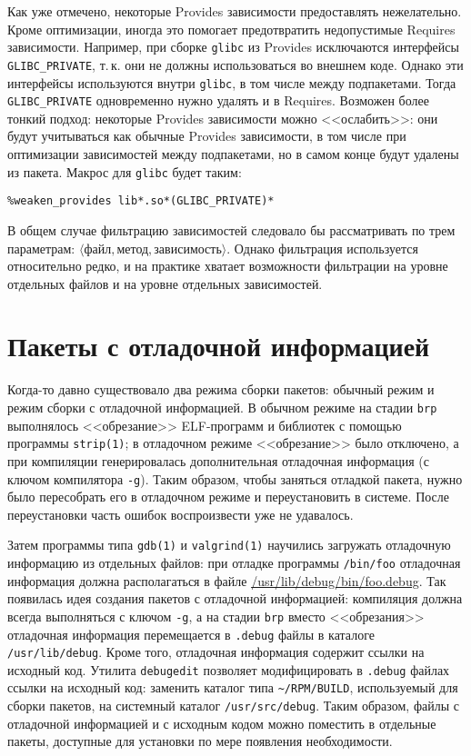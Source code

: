 \documentclass[russian,a4paper,12pt,titlepage]{article}
\begin{document}
Как уже отмечено, некоторые Provides зависимости предоставлять нежелательно.  Кроме оптимизации, иногда это помогает
предотвратить недопустимые Requires зависимости.  Например, при сборке \verb|glibc| из Provides исключаются интерфейсы
\verb|GLIBC_PRIVATE|, т.\,к. они не должны использоваться во внешнем коде.
Однако эти интерфейсы используются внутри \verb|glibc|, в том числе между подпакетами.  Тогда
\verb|GLIBC_PRIVATE| одновременно нужно удалять и в Requires.  Возможен более тонкий подход: некоторые Provides зависимости
можно <<ослабить>>: они будут учитываться как обычные Provides зависимости, в том числе при оптимизации зависимостей между
подпакетами, но в самом конце будут удалены из пакета.  Макрос для \verb|glibc| будет таким:
\begin{verbatim}
%weaken_provides lib*.so*(GLIBC_PRIVATE)*
\end{verbatim}

В общем случае фильтрацию зависимостей следовало бы рассматривать по трем параметрам:
$\langle\textit{файл},\textit{метод},\textit{зависимость}\rangle$.  Однако фильтрация используется относительно редко,
и на практике хватает возможности фильтрации на уровне отдельных файлов и на уровне отдельных зависимостей.

\section{Пакеты с отладочной информацией}
\label{debuginfo-packages}
Когда-то давно существовало два режима сборки пакетов: обычный режим и режим сборки с отладочной информацией.
В обычном режиме на стадии \verb|brp| выполнялось <<обрезание>> ELF-программ и библиотек с помощью программы \verb|strip(1)|;
в отладочном режиме <<обрезание>> было отключено, а при компиляции генерировалась дополнительная отладочная информация (с ключом
компилятора \verb|-g|).  Таким образом, чтобы заняться отладкой пакета, нужно было пересобрать его в отладочном режиме и переустановить
в системе.  После переустановки часть ошибок воспроизвести уже не удавалось.

Затем программы типа \verb|gdb(1)| и \verb|valgrind(1)| научились загружать отладочную информацию из отдельных файлов:
при отладке программы \verb|/bin/foo| отладочная информация должна располагаться в файле \url{/usr/lib/debug/bin/foo.debug}.
Так появилась идея создания пакетов с отладочной информацией: компиляция должна всегда выполняться с ключом \verb|-g|,
а на стадии \verb|brp| вместо <<обрезания>> отладочная информация перемещается в \verb|.debug| файлы
в каталоге \verb|/usr/lib/debug|.  Кроме того, отладочная информация содержит ссылки на исходный код.
Утилита \verb|debugedit| позволяет модифицировать в \verb|.debug| файлах ссылки на исходный код: заменить каталог
типа \verb|~/RPM/BUILD|, используемый для сборки пакетов, на системный каталог \verb|/usr/src/debug|.  Таким образом,
файлы с отладочной информацией и с исходным кодом можно поместить в отдельные пакеты, доступные для установки
по мере появления необходимости.
\end{document}
